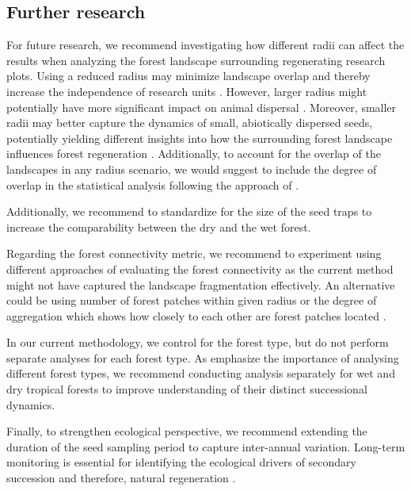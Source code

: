 \subsection{Further research } 
For future research, we recommend investigating how different radii can affect the results when analyzing the forest landscape surrounding regenerating research plots. Using a reduced radius may minimize  landscape overlap and thereby increase the independence of research units \citep{v.h.safarLandscapeOpennessHas2022a}. However, larger radius might potentially have more significant impact on animal dispersal \citep{v.h.safarLandscapeOpennessHas2022a}. Moreover, smaller radii may better capture the dynamics of small, abiotically dispersed seeds, potentially yielding different insights into how the surrounding forest landscape influences forest regeneration \citep{jakovacRoleLanduseHistory2021}. Additionally, to account for the overlap of the landscapes in any radius scenario, we would suggest to include the degree of overlap in the statistical analysis following the approach of \cite{v.h.safarLandscapeOpennessHas2022a}. 

Additionally, we recommend to standardize for the size of the seed traps to increase the comparability between the dry and the wet forest. 

Regarding the forest connectivity metric, we recommend to experiment using different approaches of evaluating the forest connectivity as the current method might not have captured the landscape fragmentation effectively. An alternative could be using number of forest patches within given radius or the degree of aggregation which shows how closely to each other are forest patches located \citep{he2000aggregation, mcgarigal2002fragstats}.

In our current methodology, we control for the forest type, but do not perform separate analyses for each forest type. As \cite{lohbeckSuccessionalChangesFunctional2013} emphasize the importance of analysing different forest types, we recommend conducting analysis separately for wet and dry tropical forests to improve understanding of their distinct successional dynamics. 

Finally, to strengthen ecological perspective, we recommend extending the duration of the seed sampling period to capture inter-annual variation. Long-term monitoring is essential for identifying the ecological drivers of secondary succession and therefore, natural regeneration \citep{chazdonNaturalRegenerationTool2016}.

